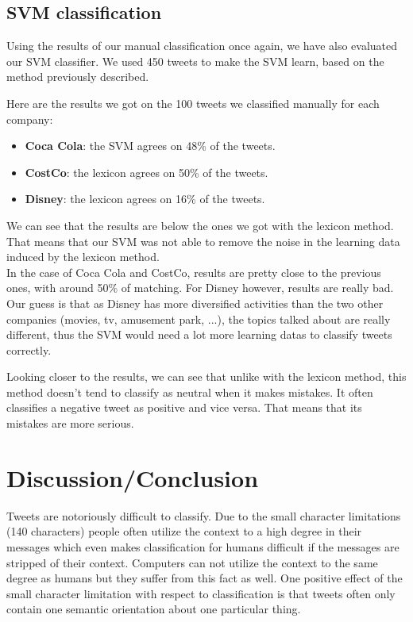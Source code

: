 \documentclass[a4paper,12pt]{report}
\begin{document}
\section{SVM classification}

Using the results  of our manual classification once again, we have also evaluated our SVM classifier.
We used 450 tweets to make the SVM learn, based on the method previously described.

Here are the results we got on the 100 tweets we classified manually for each company:
\begin{itemize}
        \item \textbf{Coca Cola}: the SVM agrees on 48\% of the tweets.
        \item \textbf{CostCo}: the lexicon agrees on 50\% of the tweets.
        \item \textbf{Disney}: the lexicon agrees on 16\% of the tweets.
\end{itemize}
We can see that the results are below the ones we got with the lexicon method.
That means that our SVM was not able to remove the noise in the learning data induced by the lexicon method.\\
In the case of Coca Cola and CostCo, results are pretty close to the previous ones, with around 50\% of matching.
For Disney however, results are really bad. Our guess  is that as Disney has more diversified activities than the two other companies (movies, tv, amusement park, ...), the topics talked about are really different, thus the SVM would need a lot more learning datas to classify tweets correctly.

Looking closer to the results, we can see that unlike with the lexicon method, this method doesn't tend to classify as neutral when it makes mistakes.
It often classifies a negative tweet as positive and vice versa.
That means that its mistakes are more serious.






\chapter{Discussion/Conclusion}
Tweets are notoriously difficult to classify. Due to the small character limitations (140 characters) people often utilize the context to a high degree in their messages which even makes classification for humans difficult if the messages are stripped of their context. Computers can not utilize the context to the same degree as humans but they suffer from this fact as well. One positive effect of the small character limitation with respect to classification is that tweets often only contain one semantic orientation about one particular thing.
\end{document}
